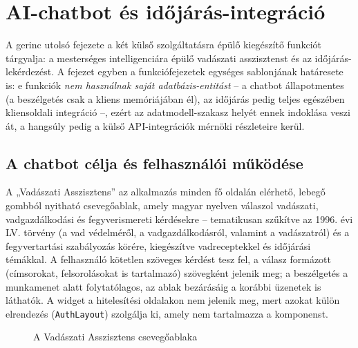 
\chapter{AI-chatbot és időjárás-integráció}
\label{chap:chatbot}

A gerinc utolsó fejezete a két külső szolgáltatásra épülő kiegészítő funkciót tárgyalja: a
mesterséges intelligenciára épülő vadászati asszisztenst és az időjárás-lekérdezést. A fejezet
egyben a funkciófejezetek egységes sablonjának határesete is: e funkciók \emph{nem használnak
saját adatbázis-entitást} -- a chatbot állapotmentes (a beszélgetés csak a kliens memóriájában
él), az időjárás pedig teljes egészében kliensoldali integráció --, ezért az adatmodell-szakasz
helyét ennek indoklása veszi át, a hangsúly pedig a külső API-integrációk mérnöki részleteire
kerül.

\section{A chatbot célja és felhasználói működése}
\label{sec:chat-cel}

A „Vadászati Asszisztens” az alkalmazás minden fő oldalán elérhető, lebegő gombból nyitható
csevegőablak, amely magyar nyelven válaszol vadászati, vadgazdálkodási és fegyverismereti
kérdésekre -- tematikusan szűkítve az 1996. évi LV. törvény (a vad védelméről, a
vadgazdálkodásról, valamint a vadászatról) és a fegyvertartási szabályozás körére, kiegészítve
vadreceptekkel és időjárási témákkal. A felhasználó kötetlen szöveges kérdést tesz fel, a válasz
formázott (címsorokat, felsorolásokat is tartalmazó) szövegként jelenik meg; a beszélgetés a
munkamenet alatt folytatólagos, az ablak bezárásáig a korábbi üzenetek is láthatók. A widget a
hitelesítési oldalakon nem jelenik meg, mert azokat külön elrendezés (\texttt{AuthLayout})
szolgálja ki, amely nem tartalmazza a komponenst.

\begin{figure}[htbp]
	\centering
	\caption{A Vadászati Asszisztens csevegőablaka}
	\label{fig:chatbot-screen}
\end{figure}

